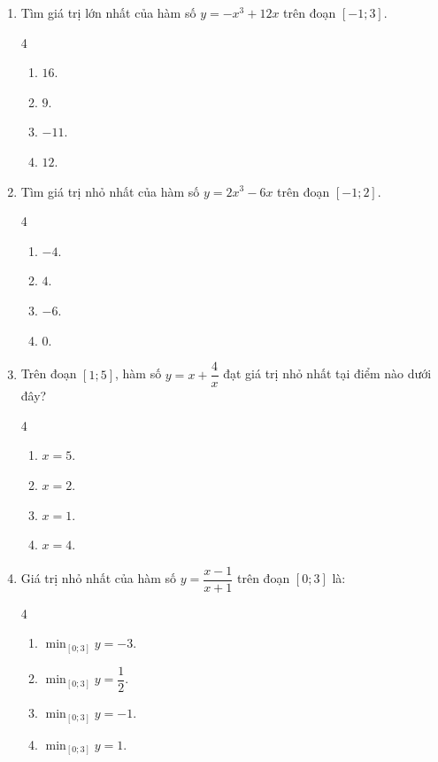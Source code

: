 \documentclass[12pt]{article}
\begin{document}
\begin{enumerate}[label=\textbf{Câu \arabic*.}]
		\item Tìm giá trị lớn nhất của hàm số $y = -x^3 + 12x$ trên đoạn $[-1; 3]$.
		\begin{multicols}{4}
			\begin{enumerate}[label=\textbf{\Alph*.}]
				\item $16$.
				\item $9$.
				\item $-11$.
				\item $12$.
			\end{enumerate}
		\end{multicols}
		
		\item Tìm giá trị nhỏ nhất của hàm số $y = 2x^3 - 6x$ trên đoạn $[-1; 2]$.
		\begin{multicols}{4}
			\begin{enumerate}[label=\textbf{\Alph*.}]
				\item $-4$.
				\item $4$.
				\item $-6$.
				\item $0$.
			\end{enumerate}
		\end{multicols}
		
		\item Trên đoạn $[1; 5]$, hàm số $y = x + \dfrac{4}{x}$ đạt giá trị nhỏ nhất tại điểm nào dưới đây?
		\begin{multicols}{4}
			\begin{enumerate}[label=\textbf{\Alph*.}]
				\item $x = 5$.
				\item $x = 2$.
				\item $x = 1$.
				\item $x = 4$.
			\end{enumerate}
		\end{multicols}
		
		\item Giá trị nhỏ nhất của hàm số $y = \dfrac{x - 1}{x + 1}$ trên đoạn $[0; 3]$ là:
		\begin{multicols}{4}
			\begin{enumerate}[label=\textbf{\Alph*.}]
				\item $\min_{[0; 3]} y = -3$.
				\item $\min_{[0; 3]} y = \dfrac{1}{2}$.
				\item $\min_{[0; 3]} y = -1$.
				\item $\min_{[0; 3]} y = 1$.
			\end{enumerate}
		\end{multicols}
		

\end{enumerate}
\end{document}
